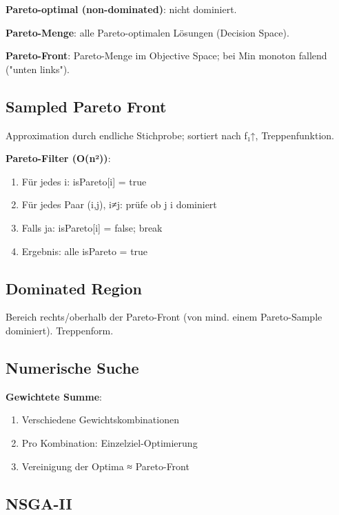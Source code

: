 \documentclass[11pt, a4paper]{article}
\begin{document}
\textbf{Pareto-optimal (non-dominated)}: nicht dominiert.

\textbf{Pareto-Menge}: alle Pareto-optimalen Lösungen (Decision Space).

\textbf{Pareto-Front}: Pareto-Menge im Objective Space; bei Min monoton fallend ("unten links").



\subsection{Sampled Pareto Front}

Approximation durch endliche Stichprobe; sortiert nach f₁↑, Treppenfunktion.


\textbf{Pareto-Filter (O(n²))}:

\begin{enumerate}
  \item Für jedes i: isPareto[i] = true
  \item Für jedes Paar (i,j), i≠j: prüfe ob j i dominiert
  \item Falls ja: isPareto[i] = false; break
  \item Ergebnis: alle isPareto = true
\end{enumerate}


\subsection{Dominated Region}

Bereich rechts/oberhalb der Pareto-Front (von mind. einem Pareto-Sample dominiert). Treppenform.



\subsection{Numerische Suche}

\textbf{Gewichtete Summe}:

\begin{enumerate}
  \item Verschiedene Gewichtskombinationen
  \item Pro Kombination: Einzelziel-Optimierung
  \item Vereinigung der Optima ≈ Pareto-Front
\end{enumerate}


\subsection{NSGA-II}
\end{document}
